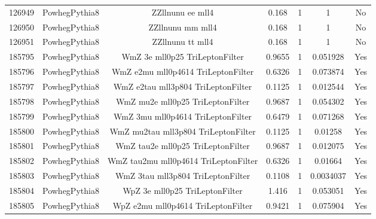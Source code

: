 \begin{table}[ht!]
\begin{footnotesize}
\begin{tabular}{c|c|c|c|c|c|c}
126949 & PowhegPythia8& ZZllnunu ee mll4  &  0.168  &  1  &  1 & No \\
126950 & PowhegPythia8& ZZllnunu mm mll4  &  0.168  &  1  &  1 & No \\
126951 & PowhegPythia8& ZZllnunu tt mll4  &  0.168  &  1  &  1 & No \\
185795  &  PowhegPythia8 &  WmZ 3e mll0p25 TriLeptonFilter  &  0.9655  &  1  &  0.051928 & Yes \\
185796  &  PowhegPythia8 &  WmZ e2mu mll0p4614 TriLeptonFilter  &  0.6326  &  1  &  0.073874  & Yes \\
185797  &  PowhegPythia8 &  WmZ e2tau mll3p804 TriLeptonFilter  &  0.1125  &  1  &  0.012544  & Yes \\
185798  &  PowhegPythia8 &  WmZ mu2e mll0p25 TriLeptonFilter  &  0.9687  &  1  &  0.054302  & Yes \\
185799  &  PowhegPythia8 &  WmZ 3mu mll0p4614 TriLeptonFilter  &  0.6479  &  1  &  0.071268  & Yes \\
185800  &  PowhegPythia8 &  WmZ mu2tau mll3p804 TriLeptonFilter  &  0.1125  &  1  &  0.01258  & Yes \\
185801  &  PowhegPythia8 &  WmZ tau2e mll0p25 TriLeptonFilter  &  0.9687  &  1  &  0.012075  & Yes \\
185802  &  PowhegPythia8 &  WmZ tau2mu mll0p4614 TriLeptonFilter  &  0.6326  &  1  &  0.01664 & Yes \\
185803  &  PowhegPythia8 &  WmZ 3tau mll3p804 TriLeptonFilter  &  0.1108  &  1  &  0.0034037  & Yes \\
185804  &  PowhegPythia8 &  WpZ 3e mll0p25 TriLeptonFilter  &  1.416  &  1  &  0.053051 & Yes  \\
185805  &  PowhegPythia8 &  WpZ e2mu mll0p4614 TriLeptonFilter  &  0.9421  &  1  &  0.075904  & Yes \\

\end{tabular}
\end{footnotesize}
\end{table}
